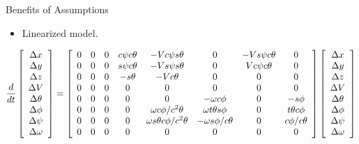 \documentclass[hyperref={pdfpagelabels=false}]{beamer}
\begin{document}
\begin{frame}{Benefits of Assumptions}
\begin{itemize}
\item Linearized model.
\end{itemize}
{\tiny
\begin{align*}
\frac{d}{dt}\left[\begin{array}{c}
\Delta x \\ \Delta y \\ \Delta z \\ \Delta V \\ \Delta \theta \\ \Delta \phi \\ \Delta \psi \\ \Delta \omega
\end{array}\right] =
\left[\begin{array}{c c c c c c c c}
0 & 0 & 0 & c\psi c\theta & -V c\psi s\theta               & 0                     & -V s\psi c\theta & 0 \\
0 & 0 & 0 & s\psi c\theta & -V s\psi s\theta               & 0                     & V c\psi c\theta  & 0 \\
0 & 0 & 0 & -s\theta      & -V c\theta                     & 0                     & 0                & 0 \\
0 & 0 & 0 & 0             & 0                              & 0                     & 0                & 0 \\
0 & 0 & 0 & 0             & 0                              & -\omega c\phi         & 0                & -s\phi \\
0 & 0 & 0 & 0             & \omega c\phi/c^2\theta         & \omega t\theta s\phi  & 0                & t\theta c\phi \\
0 & 0 & 0 & 0             & \omega s\theta c\phi/c^2\theta & -\omega s\phi/c\theta & 0                & c\phi/c\theta \\
0 & 0 & 0 & 0             & 0                              & 0                     & 0                & 0
\end{array}\right]
\left[\begin{array}{c}
\Delta x \\ \Delta y \\ \Delta z \\ \Delta V \\ \Delta \theta \\ \Delta \phi \\ \Delta \psi \\ \Delta \omega
\end{array}\right]
\end{align*}
}
\end{frame}
\end{document}
